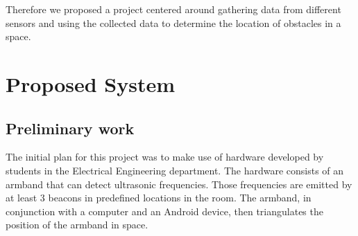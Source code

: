 \documentclass[prodmode,acmtecs]{acmsmall} %
\begin{document}
Therefore we proposed a project centered around gathering data from different sensors and using the collected data to determine the location of obstacles in a space.


\section{Proposed System}
\subsection{Preliminary work}
The initial plan for this project was to make use of hardware developed by students in the Electrical Engineering department. The hardware consists of an armband that can detect ultrasonic frequencies. Those frequencies are emitted by at least 3 beacons in predefined locations in the room. The armband, in conjunction with a computer and an Android device, then triangulates the position of the armband in space.
\end{document}
